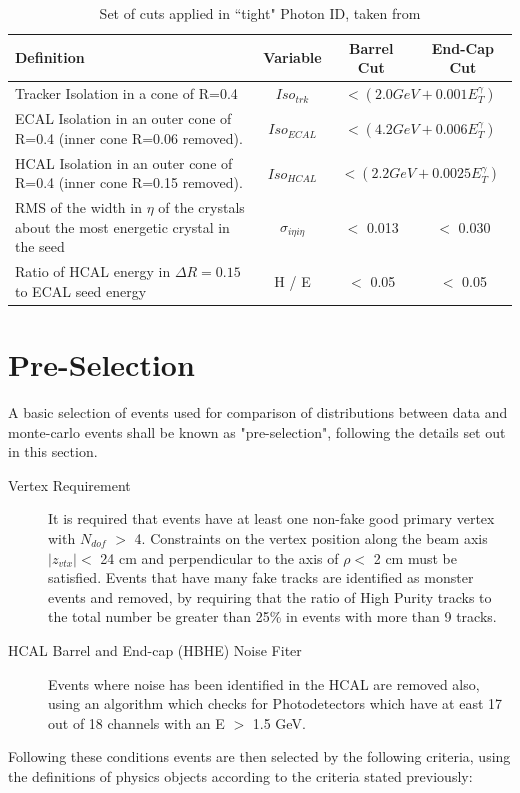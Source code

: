 \begin{table}[htbp]
\centering
\begin{tabular}{ m{6.9cm}  c  c  c}
\hline
\hline
 \centering Definition & Variable & Barrel Cut & End-Cap Cut \\
\hline
\hline
Tracker Isolation in a cone of R=0.4 & $Iso_{trk}$ & \multicolumn{2}{c}{$< (2.0 GeV + 0.001E_{T}^{\gamma})$}\\
ECAL Isolation in an outer cone of R=0.4 (inner cone R=0.06 removed). & $Iso_{ECAL}$ & \multicolumn{2}{c}{$< (4.2 GeV + 0.006E_{T}^{\gamma})$}\\

HCAL Isolation in an outer cone of R=0.4 (inner cone R=0.15 removed). & $Iso_{HCAL}$ & \multicolumn{2}{c}{$< (2.2 GeV + 0.0025E_{T}^{\gamma})$}\\

RMS of the width in $\eta$ of the crystals about the most energetic crystal in the seed& $\sigma_{i \eta i \eta}$ & $<$ 0.013 & $<$ 0.030\\
Ratio of HCAL energy in $\Delta R = 0.15$ to ECAL seed energy & H / E & $<$ 0.05 & $<$ 0.05\\
\hline
\end{tabular}
\caption{\label{tab:pid} Set of cuts applied in ``tight" Photon ID, taken from \cite{EGM-10-006}}
\end{table}

\section{Pre-Selection}
A basic selection of events used for comparison of distributions between data and monte-carlo events shall be known as "pre-selection",  following the details set out in this section.

\begin{description}
\item[Vertex Requirement]{It is required that events have at least one non-fake good primary vertex with $N_{dof}$ $>$ 4. Constraints on the vertex position along the beam axis $|z_{vtx}| <$ 24 cm and perpendicular to the axis of $\rho <$ 2 cm must be satisfied. Events that have many fake tracks are identified as monster events and removed, by requiring that the ratio of High Purity tracks to the total number be greater than 25\% in events with more than 9 tracks. }

\item[HCAL Barrel and End-cap (HBHE) Noise Fiter]{Events where noise has been identified in the HCAL are removed also, using an algorithm which checks for Photodetectors which have at east 17 out of 18 channels with an E $>$ 1.5 GeV.}
\end{description}
Following these conditions events are then selected by the following criteria, using the definitions of physics objects according to the criteria stated previously:

